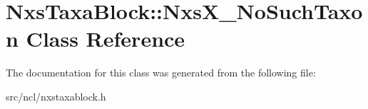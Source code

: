 \hypertarget{classNxsTaxaBlock_1_1NxsX__NoSuchTaxon}{
\section{NxsTaxaBlock::NxsX\_\-NoSuchTaxon Class Reference}
\label{classNxsTaxaBlock_1_1NxsX__NoSuchTaxon}
}


The documentation for this class was generated from the following file:\begin{DoxyCompactItemize}
\item 
src/ncl/nxstaxablock.h\end{DoxyCompactItemize}
